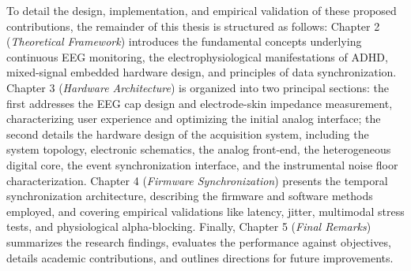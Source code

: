 To detail the design, implementation, and empirical validation of these proposed contributions, the remainder of this thesis is structured as follows: Chapter 2 (\textit{Theoretical Framework}) introduces the fundamental concepts underlying continuous \gls{EEG} monitoring, the electrophysiological manifestations of \gls{ADHD}, mixed-signal embedded hardware design, and principles of data synchronization. Chapter 3 (\textit{Hardware Architecture}) is organized into two principal sections: the first addresses the \gls{EEG} cap design and electrode-skin impedance measurement, characterizing user experience and optimizing the initial analog interface; the second details the hardware design of the acquisition system, including the system topology, electronic schematics, the analog front-end, the heterogeneous digital core, the event synchronization interface, and the instrumental noise floor characterization. Chapter 4 (\textit{Firmware Synchronization}) presents the temporal synchronization architecture, describing the firmware and software methods employed, and covering empirical validations like latency, jitter, multimodal stress tests, and physiological alpha-blocking. Finally, Chapter 5 (\textit{Final Remarks}) summarizes the research findings, evaluates the performance against objectives, details academic contributions, and outlines directions for future improvements.
